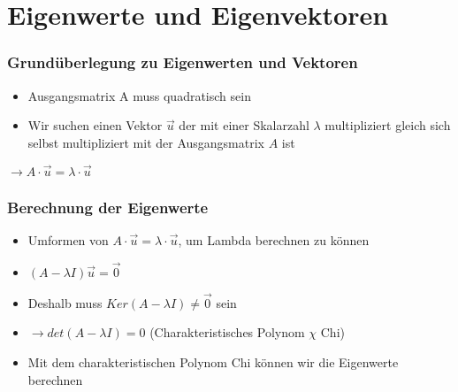 \section{Eigenwerte und Eigenvektoren}


\begin{frame}
    \frametitle{Grundüberlegung zu Eigenwerten und Vektoren}
    \begin{itemize}
        \item Ausgangsmatrix A muss quadratisch sein
        \item Wir suchen einen Vektor $\vec{u}$ der mit einer Skalarzahl $\lambda$ multipliziert gleich sich selbst multipliziert mit der Ausgangsmatrix $A$ ist
    \end{itemize}
    $\rightarrow A \cdot \vec{u} = \lambda \cdot \vec{u}$
\end{frame}
\begin{frame}
    \frametitle{Berechnung der Eigenwerte}
    \begin{itemize}
        \item Umformen von $A \cdot \vec{u} = \lambda \cdot \vec{u}$, um Lambda berechnen zu können
        \item $(A- \lambda I)\vec{u} = \vec{0}$
        \item Deshalb muss $Ker(A - \lambda I) \neq \vec{0}$ sein
        \item $\rightarrow det(A - \lambda I) = 0$ (Charakteristisches Polynom $\chi$ Chi)
        \item Mit dem charakteristischen Polynom Chi können wir die Eigenwerte berechnen
    \end{itemize}
\end{frame}
